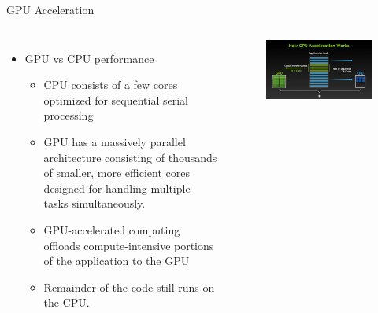 \documentclass[aspectratio=169]{beamer}
\begin{document}
\begin{frame}[fragile]{GPU Acceleration}
\begin{columns}

\begin{itemize}
\item GPU vs CPU performance
\begin{itemize}
\item CPU consists of a few cores optimized for sequential serial processing
\item GPU has a massively parallel architecture consisting of thousands of smaller, more efficient cores designed for handling multiple tasks simultaneously.
\item GPU-accelerated computing offloads compute-intensive portions of the application to the GPU
\item Remainder of the code still runs on the CPU. 
\end{itemize}
\end{itemize}

\begin{figure}
\includegraphics[scale=0.4]{Graphics/GPU.png}
\end{figure}
\end{columns}
\end{frame}
\end{document}
